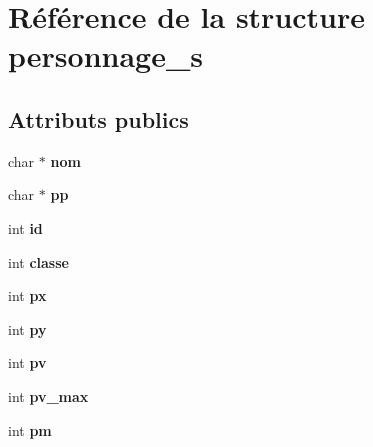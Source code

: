 \hypertarget{structpersonnage__s}{}\section{Référence de la structure personnage\+\_\+s}
\label{structpersonnage__s}
\subsection*{Attributs publics}
\begin{DoxyCompactItemize}
\item 
\mbox{\label{structpersonnage__s_ac0fc9fa7fa00b5d1e1ba1ad3a424cef3}} 
char $\ast$ {\bfseries nom}
\item 
\mbox{\label{structpersonnage__s_a7aaaa899a653a1f2ab3566e5bd6a1a42}} 
char $\ast$ {\bfseries pp}
\item 
\mbox{\label{structpersonnage__s_a07d07848be2033ea8b7eba44e778a2e9}} 
int {\bfseries id}
\item 
\mbox{\label{structpersonnage__s_a36ab571d28910458a8da6782ca44e2cb}} 
int {\bfseries classe}
\item 
\mbox{\label{structpersonnage__s_a4e2d1933481c1e77efe9278329a12f8a}} 
int {\bfseries px}
\item 
\mbox{\label{structpersonnage__s_a0d86eecefc9e77513725ffa84e272f31}} 
int {\bfseries py}
\item 
\mbox{\label{structpersonnage__s_ab3090d9110756af454516f939e9f8a86}} 
int {\bfseries pv}
\item 
\mbox{\label{structpersonnage__s_a0e58c8761de9044ce770f21aa9ada41a}} 
int {\bfseries pv\+\_\+max}
\item 
\mbox{\label{structpersonnage__s_ac9cb52498ece1786895b2c23275f5298}} 
int {\bfseries pm}
\item 
\mbox{\label{structpersonnage__s_a439bf5dfed4865619493cc5b68f8c98f}} 

\end{DoxyCompactItemize}
